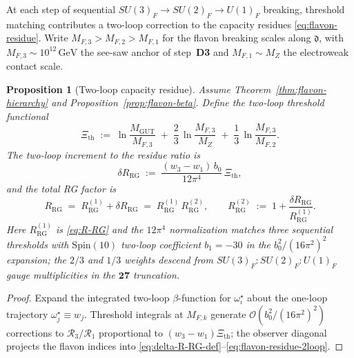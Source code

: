 \documentclass[aps,prd,onecolumn,amsmath,amssymb,nofootinbib,11pt]{revtex4-2}
\numberwithin{equation}{section}
\theoremstyle{plain}
\newtheorem{proposition}[theorem]{Proposition}
\theoremstyle{definition}
\theoremstyle{remark}
\newcommand{\Spin}{\mathrm{Spin}}
\begin{document}
At each step of sequential $SU(3)_F\to SU(2)_F\to U(1)_F$ breaking,
threshold matching contributes a two-loop correction to the capacity
residues \eqref{eq:flavon-residue}. Write $M_{F,3}>M_{F,2}>M_{F,1}$ for
the flavon breaking scales along $\mathfrak{d}$, with
$M_{F,3}\sim 10^{12}\,\mathrm{GeV}$ the see-saw anchor of step~\textbf{D3}
and $M_{F,1}\sim M_Z$ the electroweak contact scale.

\begin{proposition}[Two-loop capacity residue]
\label{prop:flavon-beta-2loop}
Assume Theorem~\ref{thm:flavon-hierarchy} and Proposition~\ref{prop:flavon-beta}.
Define the two-loop threshold functional
\begin{equation}\label{eq:Xi-th}
  \Xi_{\mathrm{th}}
  \;:=\;
  \ln\!\frac{M_{\mathrm{GUT}}}{M_{F,3}}
  \;+\;
  \frac{2}{3}\,\ln\!\frac{M_{F,3}}{M_Z}
  \;+\;
  \frac{1}{3}\,\ln\!\frac{M_{F,3}}{M_{F,2}}.
\end{equation}
The two-loop increment to the residue \emph{ratio} is
\begin{equation}\label{eq:delta-R-RG-def}
  \delta R_{\mathrm{RG}}
  \;:=\;
  \frac{(w_3-w_1)\,b_0}{12\pi^4}\,\Xi_{\mathrm{th}},
\end{equation}
and the total RG factor is
\begin{equation}\label{eq:flavon-residue-2loop}
  R_{\mathrm{RG}}
  \;=\;
  R_{\mathrm{RG}}^{(1)} + \delta R_{\mathrm{RG}}
  \;=\;
  R_{\mathrm{RG}}^{(1)}\,R_{\mathrm{RG}}^{(2)},
  \qquad
  R_{\mathrm{RG}}^{(2)}
  \;:=\;
  1 + \frac{\delta R_{\mathrm{RG}}}{R_{\mathrm{RG}}^{(1)}}.
\end{equation}
Here $R_{\mathrm{RG}}^{(1)}$ is \eqref{eq:R-RG} and the $12\pi^4$ normalization
matches three sequential thresholds with $\Spin(10)$ two-loop coefficient
$b_1=-30$ in the $b_0^2/(16\pi^2)^2$ expansion; the $2/3$ and $1/3$ weights
descend from $SU(3)_F:SU(2)_F:U(1)_F$ gauge multiplicities in the
$\mathbf{27}$ truncation.
\end{proposition}

\begin{proof}
Expand the integrated two-loop $\beta$-function for $\omega^\star_\iota$ about
the one-loop trajectory $\omega^\star_j\equiv w_j$. Threshold integrals at
$M_{F,k}$ generate $\mathcal{O}(b_0^2/(16\pi^2)^2)$ corrections to
$\mathcal{R}_3/\mathcal{R}_1$ proportional to $(w_3-w_1)\Xi_{\mathrm{th}}$;
the observer diagonal projects the flavon indices into
\eqref{eq:delta-R-RG-def}--\eqref{eq:flavon-residue-2loop}.
\end{proof}
\end{document}
